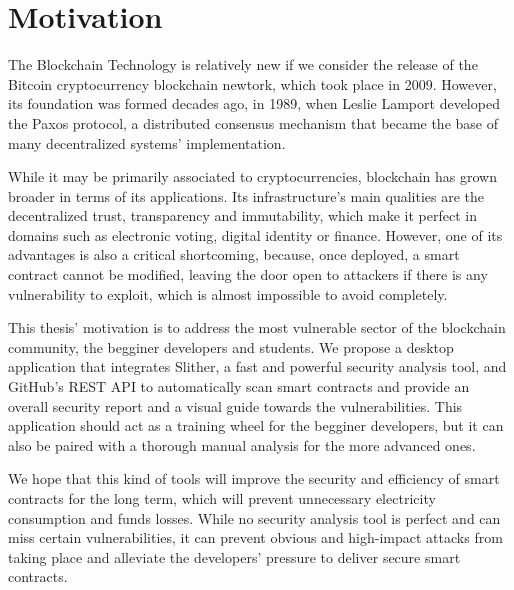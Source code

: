 \chapter*{Motivation} 

The Blockchain Technology is relatively new if we consider the release of the Bitcoin cryptocurrency blockchain newtork, which took place in 2009. However, its foundation was formed decades ago, in 1989, when Leslie Lamport developed the Paxos protocol, a distributed consensus mechanism that became the base of many decentralized systems' implementation.

While it may be primarily associated to cryptocurrencies, blockchain has grown broader in terms of its applications. Its infrastructure's main qualities are the decentralized trust, transparency and immutability, which make it perfect in domains such as electronic voting, digital identity or finance. However, one of its advantages is also a critical shortcoming, because, once deployed, a smart contract cannot be modified, leaving the door open to attackers if there is any vulnerability to exploit, which is almost impossible to avoid completely.

This thesis' motivation is to address the most vulnerable sector of the blockchain community, the begginer developers and students. We propose a desktop application that integrates Slither, a fast and powerful security analysis tool, and GitHub's REST API to automatically scan smart contracts and provide an overall security report and a visual guide towards the vulnerabilities. This application should act as a training wheel for the begginer developers, but it can also be paired with a thorough manual analysis for the more advanced ones.

We hope that this kind of tools will improve the security and efficiency of smart contracts for the long term, which will prevent unnecessary electricity consumption and funds losses. While no security analysis tool is perfect and can miss certain vulnerabilities, it can prevent obvious and high-impact attacks from taking place and alleviate the developers' pressure to deliver secure smart contracts.